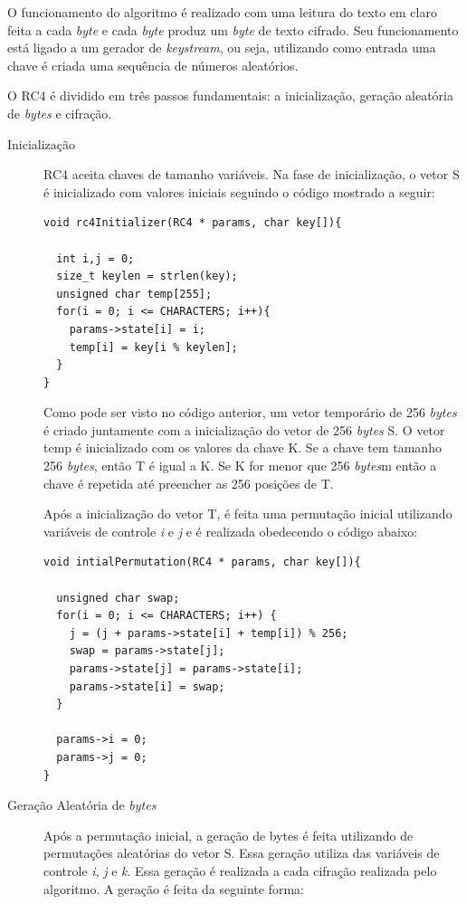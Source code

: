 O funcionamento do algoritmo é realizado com uma leitura do texto em claro feita a cada \textit{byte} e cada \textit{byte} produz um \textit{byte} de texto cifrado. Seu funcionamento está ligado a um gerador de \textit{keystream}, ou seja, utilizando como entrada uma chave é criada uma sequência de números aleatórios.

O RC4 é dividido em três passos fundamentais: a inicialização, geração aleatória de \textit{bytes} e cifração.

\begin{description}

	\item [Inicialização] RC4 aceita chaves de tamanho variáveis. Na fase de inicialização, o vetor S é inicializado com valores iniciais seguindo o código mostrado a seguir:
	
    \begin{lstlisting}[caption={Código Inicialização}, label=inicialization]
void rc4Initializer(RC4 * params, char key[]){

  int i,j = 0;
  size_t keylen = strlen(key);
  unsigned char temp[255];
  for(i = 0; i <= CHARACTERS; i++){
    params->state[i] = i;
    temp[i] = key[i % keylen];
  }
}
    \end{lstlisting}

Como pode ser visto no código anterior, um vetor temporário de 256 \textit{bytes} é criado juntamente com a inicialização do vetor de 256 \textit{bytes} S. O vetor temp é inicializado com os valores da chave K. Se a chave tem tamanho 256 \textit{bytes}, então T é igual a K. Se K for menor que 256 \textit{bytes}m então a chave é repetida até preencher as 256 posições de T.

Após a inicialização do vetor T, é feita uma permutação inicial utilizando variáveis de controle \textit{i} e \textit{j} e é realizada obedecendo o código abaixo:

    \begin{lstlisting}[caption={Código Permutação Inicial}, label=initialPermutation]
void intialPermutation(RC4 * params, char key[]){

  unsigned char swap;
  for(i = 0; i <= CHARACTERS; i++) {
    j = (j + params->state[i] + temp[i]) % 256;
    swap = params->state[j];
    params->state[j] = params->state[i];
    params->state[i] = swap;
  }

  params->i = 0;
  params->j = 0;
}
    \end{lstlisting}

	\item [Geração Aleatória de \textit{bytes}] Após a permutação inicial, a geração de bytes é feita utilizando de permutações aleatórias do vetor S. Essa geração utiliza das variáveis de controle \textit{i}, \textit{j} e \textit{k}. Essa geração é realizada a cada cifração realizada pelo algoritmo. A geração é feita da seguinte forma:
	

\end{description}
